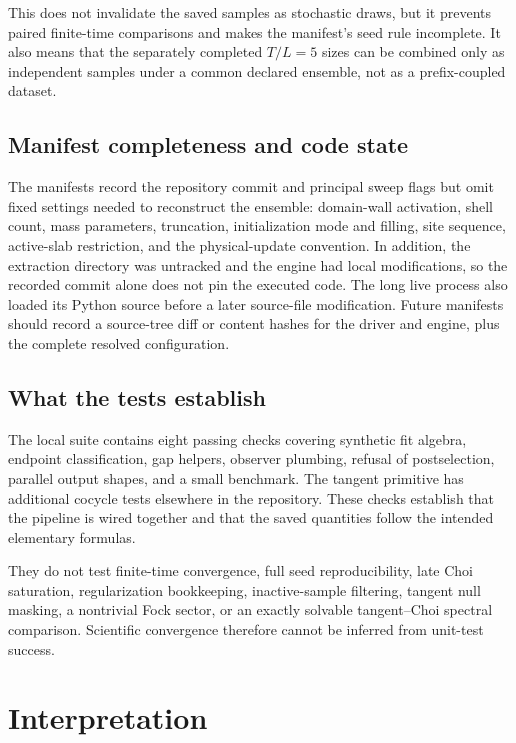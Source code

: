 \documentclass[aps,prb,onecolumn,nofootinbib,superscriptaddress]{revtex4-2}
\begin{document}
This does not invalidate the saved samples as stochastic draws, but it prevents paired
finite-time comparisons and makes the manifest's seed rule incomplete.  It also means that
the separately completed $T/L=5$ sizes can be combined only as independent samples under a
common declared ensemble, not as a prefix-coupled dataset.

\subsection{Manifest completeness and code state}

The manifests record the repository commit and principal sweep flags but omit fixed settings
needed to reconstruct the ensemble: domain-wall activation, shell count, mass parameters,
truncation, initialization mode and filling, site sequence, active-slab restriction, and the
physical-update convention.  In addition, the extraction directory was untracked and the
engine had local modifications, so the recorded commit alone does not pin the executed code.
The long live process also loaded its Python source before a later source-file modification.
Future manifests should record a source-tree diff or content hashes for the driver and engine,
plus the complete resolved configuration.

\subsection{What the tests establish}

The local suite contains eight passing checks covering synthetic fit algebra, endpoint
classification, gap helpers, observer plumbing, refusal of postselection, parallel output
shapes, and a small benchmark.  The tangent primitive has additional cocycle tests elsewhere
in the repository.  These checks establish that the pipeline is wired together and that the
saved quantities follow the intended elementary formulas.

They do not test finite-time convergence, full seed reproducibility, late Choi saturation,
regularization bookkeeping, inactive-sample filtering, tangent null masking, a nontrivial
Fock sector, or an exactly solvable tangent--Choi spectral comparison.  Scientific
convergence therefore cannot be inferred from unit-test success.

\section{Interpretation}
\end{document}
